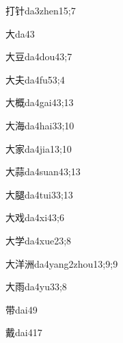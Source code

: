 \begin{verbete}{打针}{da3zhen1}{5;7}
\end{verbete}
\begin{verbete}{大}{da4}{3}
\end{verbete}
\begin{verbete}{大豆}{da4dou4}{3;7}
\end{verbete}
\begin{verbete}{大夫}{da4fu5}{3;4}
\end{verbete}
\begin{verbete}{大概}{da4gai4}{3;13}
\end{verbete}
\begin{verbete}{大海}{da4hai3}{3;10}
\end{verbete}
\begin{verbete}{大家}{da4jia1}{3;10}
\end{verbete}
\begin{verbete}{大蒜}{da4suan4}{3;13}
\end{verbete}
\begin{verbete}{大腿}{da4tui3}{3;13}
\end{verbete}
\begin{verbete}{大戏}{da4xi4}{3;6}
\end{verbete}
\begin{verbete}{大学}{da4xue2}{3;8}
\end{verbete}
\begin{verbete}{大洋洲}{da4yang2zhou1}{3;9;9}
\end{verbete}
\begin{verbete}{大雨}{da4yu3}{3;8}
\end{verbete}
\begin{verbete}{带}{dai4}{9}
\end{verbete}
\begin{verbete}{戴}{dai4}{17}
\end{verbete}
